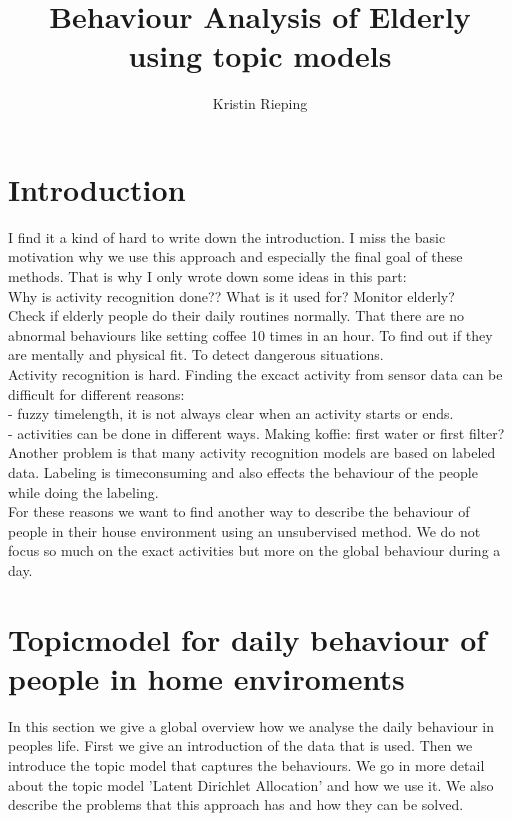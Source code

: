 \documentclass[11pt,a4paper]{article}
\title{Behaviour Analysis of Elderly using topic models}
\author{Kristin Rieping}
\begin{document}
\maketitle
\section{Introduction}
I find it a kind of hard to write down the introduction. I miss the basic motivation why we use this approach and especially the final goal of these methods. That is why I only wrote down some ideas in this part:\\



Why is activity recognition done?? What is it used for?
Monitor elderly? \\
Check if elderly people do their daily routines normally. That there are no abnormal behaviours like setting coffee 10 times in an hour. To find out if they are mentally and physical fit. To detect dangerous situations.\\

Activity recognition is hard. Finding the excact activity from sensor data can be difficult for different reasons:\\
- fuzzy timelength, it is not always clear when an activity starts or ends.\\
- activities can be done in different ways. Making koffie: first water or first filter?\\

Another problem is that many activity recognition models are based on labeled data. Labeling is timeconsuming and also effects the behaviour of the people while doing the labeling.\\

For these reasons we want to find another way to describe the behaviour of people in their house environment using an unsubervised method. We do not focus so much on the exact activities but more on the global behaviour during a day.



\section{Topicmodel for daily behaviour of people in home enviroments}
In this section we give a global overview how we analyse the daily behaviour in peoples life. First we give an introduction of the data that is used. Then we introduce the topic model that captures the behaviours. We go in more detail about the topic model 'Latent Dirichlet Allocation' and how we use it. We also describe the problems that this approach has and how they can be solved.
\end{document}
